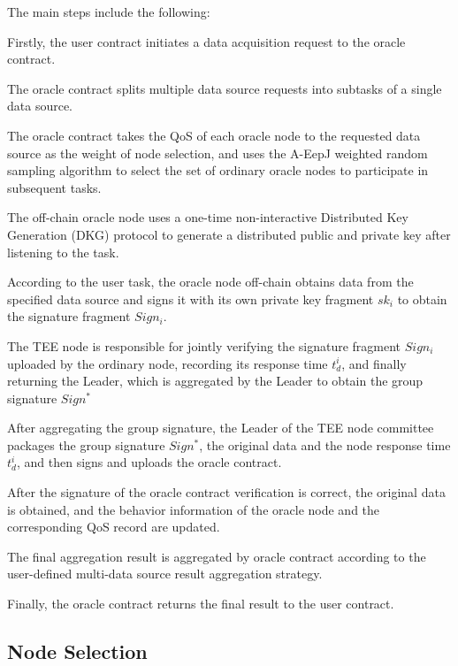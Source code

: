 \documentclass[paper]{ieice}
\newcommand*{\circled}[1]{\lower.7ex\hbox{\tikz\draw (0pt, 0pt)%
    circle (.5em) node {\makebox[1em][c]{\small #1}};}}
\begin{document}
The main steps include the following:
\begin{enumerate}[label=\circled{\arabic*}]
    \item Firstly, the user contract initiates a data acquisition request to the oracle contract.
    \item The oracle contract splits multiple data source requests into subtasks of a single data source.
    \item The oracle contract takes the QoS of each oracle node to the requested data source as the weight of node selection, and uses the A-EepJ  weighted random sampling algorithm to select the set of ordinary oracle nodes to participate in subsequent tasks.
    \item The off-chain oracle node uses a one-time non-interactive Distributed Key Generation (DKG) protocol to generate a distributed public and private key after listening to the task.
    \item According to the user task, the oracle node off-chain obtains data from the specified data source and signs it with its own private key fragment $sk_i$ to obtain the signature fragment $Sign_i$.
    \item The TEE node is responsible for jointly verifying the signature fragment $Sign_i$ uploaded by the ordinary node, recording its response time $t_d^i$, and finally returning the Leader, which is aggregated by the Leader to obtain the group signature $Sign^*$
    \item After aggregating the group signature, the Leader of the TEE node committee packages the group signature $Sign^*$, the original data and the node response time $t_d^i$, and then signs and uploads the oracle contract.
    \item After the signature of the oracle contract verification is correct, the original data is obtained, and the behavior information of the oracle node and the corresponding QoS record are updated.
    \item The final aggregation result is aggregated by oracle contract according to the user-defined multi-data source result aggregation strategy.
    \item Finally, the oracle contract returns the final result to the user contract.
\end{enumerate}


\subsection{Node Selection}
\end{document}
